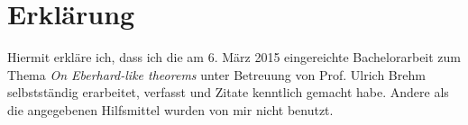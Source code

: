 \newpage
\section*{Erklärung}

Hiermit erkläre ich, dass ich die am 6. März 2015 eingereichte Bachelorarbeit zum Thema
\emph{On Eberhard-like theorems} unter Betreuung von Prof. Ulrich Brehm selbstständig erarbeitet, 
verfasst und Zitate kenntlich gemacht habe. Andere als die angegebenen Hilfsmittel 
wurden von mir nicht benutzt.
